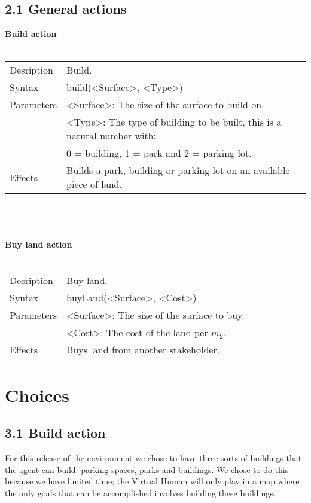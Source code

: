\documentclass[english,11pt]{report}
\begin{document}
\newpage
\section*{2.1 General actions}

\textbf{Build action}\\
\\
\begin{tabularx}{\textwidth}{lX}
 Desription & Build. \\
 Syntax & build(<Surface>, <Type>) \\
 Parameters & <Surface>: The size of the surface to build on.\\
            & <Type>: The type of building to be built, this is a natural number with: \\
            &      0 = building, 1 = park and 2 = parking lot.\\
 Effects &  Builds a park, building or parking lot on an available piece of land.
\end{tabularx}\\
\\
\\
\textbf{Buy land action}\\
\\
\begin{tabularx}{\textwidth}{lX}
 Desription & Buy land. \\
 Syntax & buyLand(<Surface>, <Cost>) \\
 Parameters & <Surface>: The size of the surface to buy.\\
            & <Cost>: The cost of the land per $m_2$.\\
 Effects &  Buys land from another stakeholder.
\end{tabularx}

\chapter{Choices}

\section*{3.1 Build action}
For this release of the environment we chose to have three sorts of buildings that the agent can build: parking spaces, parks and buildings. We chose to do this because we have limited time; the Virtual Human will only play in a map where the only goals that can be accomplished involves building these buildings.
\end{document}
